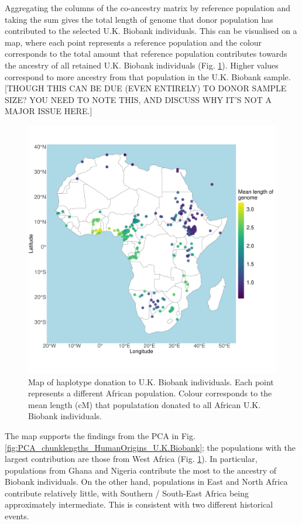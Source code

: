Aggregating the columns of the co-ancestry matrix by reference population and taking the sum gives the total length of genome that donor population has contributed to the selected U.K. Biobank individuals. This can be visualised on a map, where each point represents a reference population and the colour corresponds to the total amount that reference population contributes towards the ancestry of all retained U.K. Biobank individuals (Fig. \ref{fig:haplotype_sharing_map_zoomed_II}). Higher values correspond to more ancestry from that population in the U.K. Biobank sample.{\color{red}[THOUGH THIS CAN BE DUE (EVEN ENTIRELY) TO DONOR SAMPLE SIZE? YOU NEED TO NOTE THIS, AND DISCUSS WHY IT'S NOT A MAJOR ISSUE HERE.]} 

\begin{figure}[htp]
    \centering
    \includegraphics[width=1.0\textwidth]{../images/chapter3/haplotype_sharing_map.pdf}
    \caption{Map of haplotype donation to U.K. Biobank individuals. Each point represents a different African population. Colour corresponds to the mean length (cM) that populatation donated to all African U.K. Biobank individuals.}
    \label{fig:haplotype_sharing_map_zoomed_II}
\end{figure}

The map supports the findings from the PCA in Fig. \ref{fig:PCA_chunklengths_HumanOrigins_U.K.Biobank}; the populations with the largest contribution are those from West Africa (Fig. \ref{fig:haplotype_sharing_map_zoomed_II}). In particular, populations from Ghana and Nigeria contribute the most to the ancestry of Biobank individuals. On the other hand, populations in East and North Africa contribute relatively little, with Southern / South-East Africa being approximately intermediate. This is consistent with two different historical events. 

